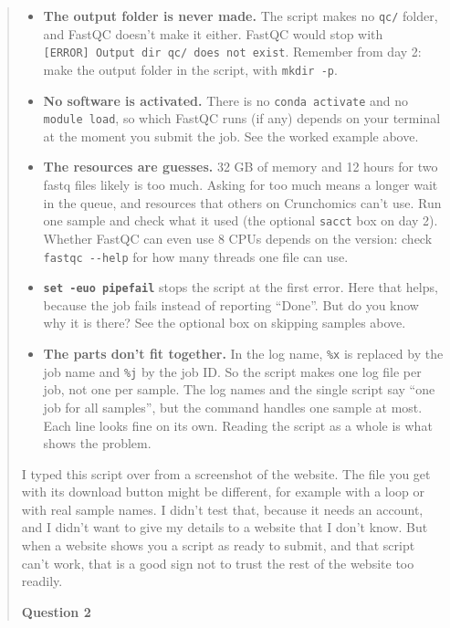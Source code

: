 \documentclass[
  letterpaper,
  DIV=11,
  numbers=noendperiod]{scrreprt}
\providecommand{\tightlist}{%
  \setlength{\itemsep}{0pt}\setlength{\parskip}{0pt}}
\begin{document}
\begin{tcolorbox}
\begin{quote}
\begin{itemize}
\tightlist
\item
  \textbf{The output folder is never made.} The script makes no
  \texttt{qc/} folder, and FastQC doesn't make it either. FastQC would
  stop with \texttt{{[}ERROR{]}\ Output\ dir\ qc/\ does\ not\ exist}.
  Remember from day 2: make the output folder in the script, with
  \texttt{mkdir\ -p}.
\item
  \textbf{No software is activated.} There is no
  \texttt{conda\ activate} and no \texttt{module\ load}, so which FastQC
  runs (if any) depends on your terminal at the moment you submit the
  job. See the worked example above.
\item
  \textbf{The resources are guesses.} 32 GB of memory and 12 hours for
  two fastq files likely is too much. Asking for too much means a longer
  wait in the queue, and resources that others on Crunchomics can't use.
  Run one sample and check what it used (the optional \texttt{sacct} box
  on day 2). Whether FastQC can even use 8 CPUs depends on the version:
  check \texttt{fastqc\ -\/-help} for how many threads one file can use.
\item
  \textbf{\texttt{set\ -euo\ pipefail}} stops the script at the first
  error. Here that helps, because the job fails instead of reporting
  ``Done''. But do you know why it is there? See the optional box on
  skipping samples above.
\item
  \textbf{The parts don't fit together.} In the log name, \texttt{\%x}
  is replaced by the job name and \texttt{\%j} by the job ID. So the
  script makes one log file per job, not one per sample. The log names
  and the single script say ``one job for all samples'', but the command
  handles one sample at most. Each line looks fine on its own. Reading
  the script as a whole is what shows the problem.
\end{itemize}

I typed this script over from a screenshot of the website. The file you
get with its download button might be different, for example with a loop
or with real sample names. I didn't test that, because it needs an
account, and I didn't want to give my details to a website that I don't
know. But when a website shows you a script as ready to submit, and that
script can't work, that is a good sign not to trust the rest of the
website too readily.

\textbf{Question 2}


\end{quote}
\end{tcolorbox}
\end{document}
